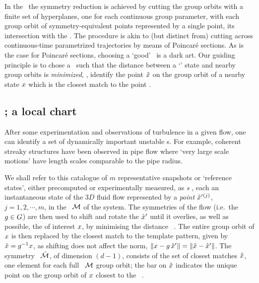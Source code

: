In the \mslices\ the symmetry reduction is achieved by cutting the group
orbits with a finite set of hyperplanes, one for each continuous group
parameter, with each group orbit of
symmetry-equivalent points represented by a single point, its
intersection with the \slice.
The procedure is akin to (but distinct from)
cutting across continuous-time parametrized trajectories by
means of Poincar\'e sections.
As is the case for Poincar\'e sections,
choosing a `good' \slice\ is a dark art. Our guiding principle is to chose
a \slice\ such that the distance between a `{\template}' state {\slicep} and nearby
group orbits is \emph{minimized}, \ie, identify the point $\hat{x}$ on the group
orbit  of a nearby state $x$ which is the closest
match to the {\template} point {\slicep}.


\subsection{\Mslices; a local chart}

After some experimentation and observations of turbulence in a given
flow, one can identify a set of dynamically important unstable
{\recurrStr s}.  For example, coherent streaky structures have been
observed in pipe flow where `very large scale motions' have
length scales comparable to the pipe radius.

We shall refer to this catalogue of $m$ representative snapshots
or `reference states', either precomputed or
experimentally measured, as  \emph{\template s}
, each an instantaneous state of the
$3D$ fluid flow represented by a
\emph{point} ${\hat{x}'}{}^{(j)}$, $j=1,2,\cdots,m$, in the
\statesp\ ${\cal M}$ of the system. The symmetries of the flow (i.e.\ the
$g\in G$) are then used to shift and rotate the {\template}
${\hat{x}'}$ until it overlies, as well as possible, the {\cohStr} of
interest $x$, by minimising the distance
\beq
\Norm{\ssp - \LieEl(\gSpace)\,\slicep}
\, .
The entire group orbit of $x$ is then replaced
by the closest match to
the template pattern,
given by
$\hat{x}=g^{-1}x$, %
as shifting does not affect the norm,
$\|{x-g\,{\hat{x}'}}\|=\|{\hat{x}-{\hat{x}'}}\|$.
The symmetry \reducedsp\ $\hat{\cal M}$, of dimension $(d\!-\!1)$, consists of
the set of closest matches $\hat{x}$, one element for each full \statesp\ ${\cal M}$
group orbit; the bar on $\hat{x}$
indicates the unique point on the group orbit of $x$ closest to
the \template\ \slicep.

